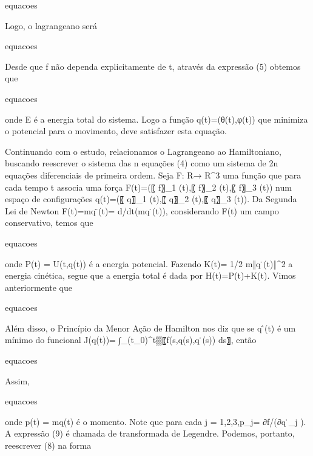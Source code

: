 \documentclass[12pt, a4paper]{article}
\begin{document}
\begin{center}
equacoes
\end{center}
  
Logo, o lagrangeano será

\begin{center}
equacoes
\end{center}

Desde que f não dependa explicitamente de t, através da expressão (5) obtemos que

\begin{center}
equacoes
\end{center}

onde E é a energia total do sistema. Logo a função q(t)=(θ(t),φ(t)) que minimiza o potencial para o movimento, deve satisfazer esta equação.

Continuando com o estudo, relacionamos o Lagrangeano ao Hamiltoniano, buscando reescrever o sistema das n equações (4) como um sistema de 2n equações diferenciais de primeira ordem.
Seja F: R→ R^3 uma função que para cada tempo t associa uma força F(t)=(〖 f〗_1 (t),〖 f〗_2 (t),〖 f〗_3 (t)) num espaço de configurações q(t)=(〖 q〗_1 (t),〖 q〗_2 (t),〖 q〗_3 (t)). Da Segunda Lei de Newton F(t)=mq ̈(t)=  d/dt(mq ̇(t)), considerando F(t) um campo conservativo, temos que

\begin{center}
equacoes
\end{center}

onde P(t) = U(t,q(t)) é a energia potencial. Fazendo K(t)= 1/2 m‖q ̇(t)‖^2 a energia cinética, segue que a energia total é dada por H(t)=P(t)+K(t).
Vimos anteriormente que 

\begin{center}
equacoes
\end{center}

Além disso, o Princípio da Menor Ação de Hamilton nos diz que se q ̂(t) é um mínimo do funcional J(q(t))= ∫_(t_0)^t▒〖f(s,q(s),q ̇(s)) ds〗, então 

\begin{center}
equacoes
\end{center}

Assim, 
\begin{center}
equacoes
\end{center}

onde p(t) = mq(t) é o momento. Note que para cada j = 1,2,3,p_j=  ∂f/(∂q ̇_j ). A expressão (9) é chamada de transformada de Legendre. Podemos, portanto, reescrever (8) na forma
\end{document}

